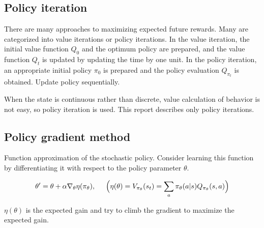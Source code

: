 \subsection{Policy iteration}

There are many approaches to maximizing expected future rewards. Many are categorized into value iterations or policy iterations.
In the value iteration, the initial value function $Q_0$ and the optimum policy are prepared, and the value function $Q_t$ is updated by updating the time by one unit. In the policy iteration, an appropriate initial policy $\pi_0$ is prepared and the policy evaluation $Q_{\pi_t}$ is obtained. Update policy sequentially.

When the state is continuous rather than discrete, value calculation of behavior is not easy, so policy iteration is used. This report describes only policy iterations.


\subsection{Policy gradient method}

Function approximation of the stochastic policy.
Consider learning this function by differentiating it with respect to the policy parameter $\theta$.

\[
\theta' = \theta + \alpha \nabla_{\theta}\eta(\pi_\theta) , \hspace{5mm}
\Bigl( \eta(\theta) = V_{\pi_\theta}(s_t) = \sum_a \pi_\theta (a|s) Q_{\pi_\theta}(s,a) \Bigr)
\]

$\eta(\theta)$ is the expected gain and try to climb the gradient to maximize the expected gain.

